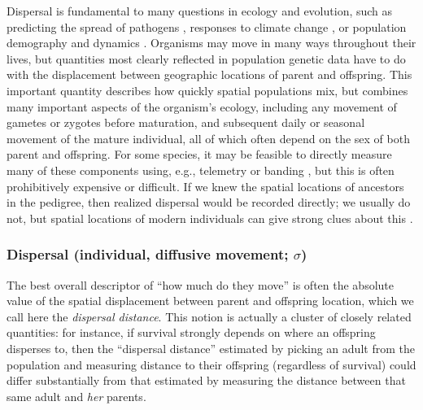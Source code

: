 \documentclass{ar-1col}
\begin{document}
Dispersal is fundamental to many questions in ecology and evolution,
such as
predicting the spread of pathogens \citep{BiekReal2010},
responses to climate change \citep{parmesan2006},
or population demography and dynamics \citep{schreiber2010interactive}.
Organisms may move in many ways throughout their lives,
but quantities most clearly reflected in population genetic data
have to do with the displacement between geographic locations of parent and offspring.
This important quantity describes how quickly spatial populations mix,
but combines many important aspects of the organism's ecology, including
any movement of gametes or zygotes before maturation,
and subsequent daily or seasonal movement of the mature individual,
all of which often depend on the sex of both parent and offspring.
For some species,
it may be feasible to directly measure many of these components
using, e.g., telemetry or banding \citep{dispersal_estimation},
but this is often prohibitively expensive or difficult.
If we knew the spatial locations of ancestors in the pedigree,
then realized dispersal would be recorded directly;
we usually do not, but spatial locations of modern individuals
can give strong clues about this \citep{Cayuela2018demographic}.


\subsubsection{Dispersal (individual, diffusive movement; $\sigma$)}

The best overall descriptor of ``how much do they move''
is often the absolute value of the spatial displacement between parent and offspring location,
which we call here the \textit{dispersal distance}.
This notion is actually a cluster of closely related quantities:
for instance, if survival strongly depends on where an offspring disperses to,
then the ``dispersal distance'' estimated by picking an adult from the population
and measuring distance to their offspring (regardless of survival)
could differ substantially from that estimated by measuring the distance between that same adult
and \textit{her} parents.
\end{document}
